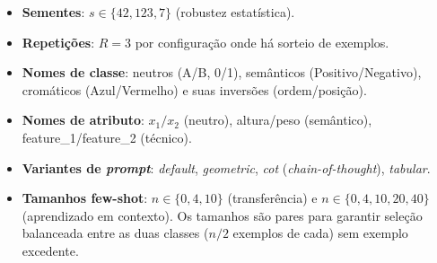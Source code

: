 \documentclass[12pt,a4paper]{article}
\begin{document}
\begin{itemize}
  \item \textbf{Sementes}: $s \in \{42, 123, 7\}$ (robustez estatística).
  \item \textbf{Repetições}: $R = 3$ por configuração onde há sorteio de exemplos.
  \item \textbf{Nomes de classe}: neutros (A/B, 0/1), semânticos (Positivo/Negativo),
    cromáticos (Azul/Vermelho) e suas inversões (ordem/posição).
  \item \textbf{Nomes de atributo}: $x_1/x_2$ (neutro), altura/peso (semântico),
    feature\_1/feature\_2 (técnico).
  \item \textbf{Variantes de \emph{prompt}}: \emph{default}, \emph{geometric}, \emph{cot}
    (\emph{chain-of-thought}), \emph{tabular}.
  \item \textbf{Tamanhos few-shot}: $n \in \{0,4,10\}$ (transferência) e
    $n \in \{0,4,10,20,40\}$ (aprendizado em contexto). Os tamanhos são pares para
    garantir seleção
    balanceada entre as duas classes ($n/2$ exemplos de cada) sem exemplo excedente.
\end{itemize}
\end{document}

